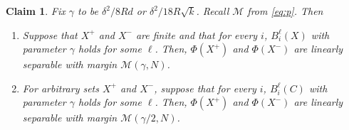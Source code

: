 \documentclass[aoap]{imsart}
\numberwithin{equation}{section}
\newtheorem{claim}[theorem]{Claim}
\theoremstyle{definition}
\theoremstyle{remark}
\numberwithin{equation}{section}
\newcommand{\0}{\mathbf{0}}
\newcommand{\1}{\mathbf{1}}
\numberwithin{equation}{section}
\begin{document}
\begin{claim}\label{claim:bilx}
Fix $\gamma$ to be $\delta^2/8Rd$ or $\delta^2/18R\sqrt{k}$. Recall $\mathcal{M}$ from \eqref{eq:p}. Then
\begin{enumerate}
    \item Suppose that $X^+$ and $X^-$ are finite and that for every $i$, $B_i^\ell(X)$ with parameter $\gamma$ holds for some $\ell$. Then, $\Phi(X^+)$ and $\Phi(X^-)$ are linearly separable with margin $\mathcal{M}(\gamma, N)$.
    \item For arbitrary sets $X^+$ and $X^-$, suppose that for every $i$, $B_i^\ell(C)$ with parameter $\gamma$ holds for some $\ell$. Then, $\Phi(X^+)$ and $\Phi(X^-)$ are linearly separable with margin $\mathcal{M}(\gamma/2, N)$.
\end{enumerate}


\end{claim}
\end{document}
